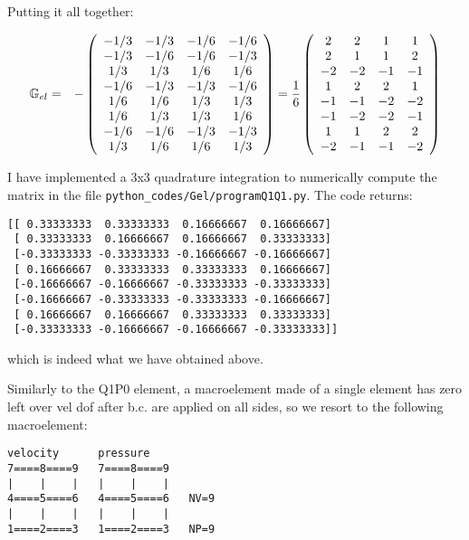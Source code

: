 Putting it all together:


\begin{eqnarray}
{\mathbb{G}}_{el} 
&=&
-
\left(
\begin{array}{cccc}
-1/3 & -1/3  & -1/6 &  -1/6  \\
-1/3 & -1/6  & -1/6 &  -1/3  \\
1/3  & 1/3   & 1/6  &   1/6 \\
-1/6 & -1/3  & -1/3 &  -1/6  \\
1/6 & 1/6    & 1/3  &   1/3 \\
1/6 & 1/3    & 1/3  &   1/6 \\
-1/6 & -1/6   & -1/3 &  -1/3  \\
1/3 & 1/6    & 1/6  &   1/3 \\
\end{array}
\right)
=
\frac{1}{6}
\left(
\begin{array}{cccc}
 2&  2&  1&  1\\
 2&  1&  1&  2\\
-2& -2& -1& -1\\
 1&  2&  2&  1\\
-1& -1& -2& -2\\
-1& -2& -2& -1\\
 1&  1&  2&  2\\
-2& -1& -1& -2
\end{array}
\right)
\end{eqnarray}

I have implemented a 3x3 quadrature integration to numerically compute the matrix in the file {\tt python\_codes/Gel/programQ1Q1.py}.
The code returns:
\begin{verbatim}
[[ 0.33333333  0.33333333  0.16666667  0.16666667]
 [ 0.33333333  0.16666667  0.16666667  0.33333333]
 [-0.33333333 -0.33333333 -0.16666667 -0.16666667]
 [ 0.16666667  0.33333333  0.33333333  0.16666667]
 [-0.16666667 -0.16666667 -0.33333333 -0.33333333]
 [-0.16666667 -0.33333333 -0.33333333 -0.16666667]
 [ 0.16666667  0.16666667  0.33333333  0.33333333]
 [-0.33333333 -0.16666667 -0.16666667 -0.33333333]]
\end{verbatim}
which is indeed what we have obtained above.

Similarly to the Q1P0 element, a macroelement made of a single element has 
zero left over vel dof after b.c. are applied on all sides, so we 
resort to the following macroelement:

\begin{verbatim}
velocity      pressure
7====8====9   7====8====9
|    |    |   |    |    |
4====5====6   4====5====6   NV=9
|    |    |   |    |    |   
1====2====3   1====2====3   NP=9
\end{verbatim}

